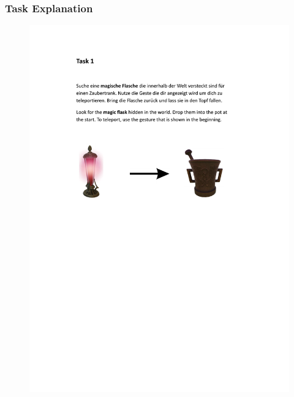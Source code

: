 \subsubsection{Task Explanation}
\begin{figure}[!h]
\centering
\includegraphics[page=1,width=\textwidth]{figures/Appendix/task explaination.pdf}
\end{figure}
